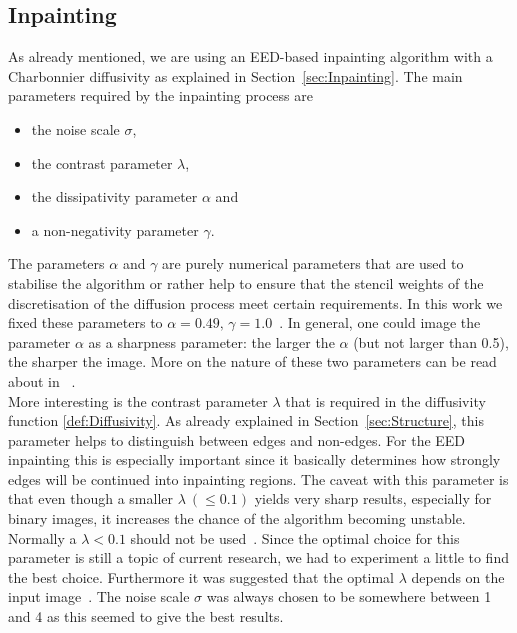 \subsection{Inpainting}\label{sec:InpaintingEx}
As already mentioned, we are using an EED-based inpainting algorithm with a Charbonnier diffusivity
as explained in Section~\ref{sec:Inpainting}.
The main parameters required by the inpainting process are 
\begin{itemize}
    \item the noise scale $\sigma$,
    \item the contrast parameter $\lambda$, 
    \item the dissipativity parameter $\alpha$ and
    \item a non-negativity parameter $\gamma$.
\end{itemize}
\newpage\noindent
The parameters $\alpha$ and $\gamma$ are purely numerical parameters that are used to 
stabilise the algorithm or rather help to ensure that the stencil weights of the discretisation of
the diffusion process meet certain requirements.
In this work we fixed these parameters to $\alpha=0.49,\, \gamma=1.0$~\cite{conversation}.
In general, one could image the parameter $\alpha$ as a sharpness parameter: the larger the
$\alpha$ (but not larger than 0.5), the sharper the image. More on the nature of these two parameters can be read about in
~\cite{www13, weickert96}.\\
More interesting is the contrast parameter $\lambda$ that is required in the diffusivity function
\eqref{def:Diffusivity}. As already explained in Section~\ref{sec:Structure}, this parameter helps to
distinguish between edges and non-edges. For the EED inpainting this is especially important since
it basically determines how strongly edges will be continued into inpainting regions.
The caveat with this parameter is that even though a smaller $\lambda\ (\leq0.1)$ yields very sharp
results, especially for binary images, it increases the chance of the algorithm becoming unstable.
Normally a $\lambda<0.1$ should not be used~\cite{conversation}. Since the optimal choice for this parameter is still a
topic of current research, we had to experiment a little to find the best choice. Furthermore it was
suggested that the optimal $\lambda$ depends on the input image~\cite{schmaltz14}. 
The noise scale $\sigma$ was always chosen to be somewhere between 1 and 4 as this seemed to give
the best results.
